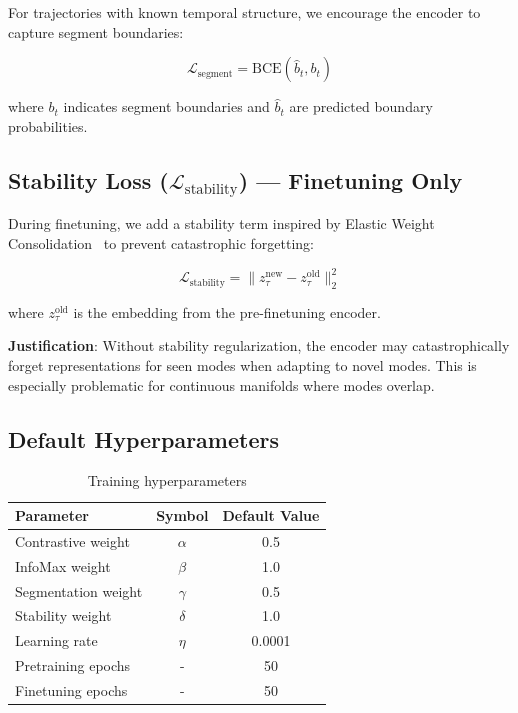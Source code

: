 \documentclass{article}
\begin{document}
For trajectories with known temporal structure, we encourage the encoder to capture segment boundaries:

\begin{equation}
    \mathcal{L}_{\text{segment}} = \text{BCE}(\hat{b}_t, b_t)
\end{equation}

where $b_t$ indicates segment boundaries and $\hat{b}_t$ are predicted boundary probabilities.

\subsection{Stability Loss ($\mathcal{L}_{\text{stability}}$) — Finetuning Only}

During finetuning, we add a stability term inspired by Elastic Weight Consolidation~\cite{kirkpatrick2017overcoming} to prevent catastrophic forgetting:

\begin{equation}
    \mathcal{L}_{\text{stability}} = \|z_\tau^{\text{new}} - z_\tau^{\text{old}}\|_2^2
\end{equation}

where $z_\tau^{\text{old}}$ is the embedding from the pre-finetuning encoder.

\textbf{Justification}: Without stability regularization, the encoder may catastrophically forget representations for seen modes when adapting to novel modes. This is especially problematic for continuous manifolds where modes overlap.

\subsection{Default Hyperparameters}

\begin{table}[h]
\centering
\begin{tabular}{lcc}
\toprule
\textbf{Parameter} & \textbf{Symbol} & \textbf{Default Value} \\
\midrule
Contrastive weight & $\alpha$ & 0.5 \\
InfoMax weight & $\beta$ & 1.0 \\
Segmentation weight & $\gamma$ & 0.5 \\
Stability weight & $\delta$ & 1.0 \\
Learning rate & $\eta$ & 0.0001 \\
Pretraining epochs & - & 50 \\
Finetuning epochs & - & 50 \\
\bottomrule
\end{tabular}
\caption{Training hyperparameters}
\end{table}
\end{document}
